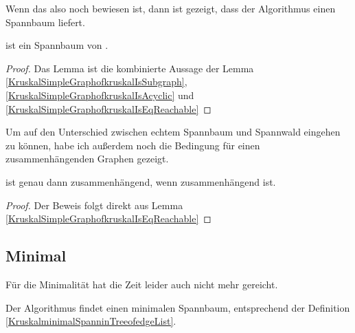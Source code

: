 Wenn das also noch bewiesen ist, dann ist gezeigt, dass der Algorithmus einen Spannbaum liefert.

\begin{lemma}[\KruskalSimpleGraphofkruskalIsSpanningTree]\label{KruskalSimpleGraphofkruskalIsSpanningTree}
  \KruskalSimpleGraphofkruskal ist ein Spannbaum von \KruskalSimpleGraphofnofedgeList.
\end{lemma}
\begin{proof}
  Das Lemma ist die kombinierte Aussage der Lemma \ref{KruskalSimpleGraphofkruskalIsSubgraph},  \ref{KruskalSimpleGraphofkruskalIsAcyclic} und  \ref{KruskalSimpleGraphofkruskalIsEqReachable}
\end{proof}

Um auf den Unterschied zwischen echtem Spannbaum und Spannwald eingehen zu können, habe ich außerdem noch die Bedingung für einen zusammenhängenden Graphen gezeigt.

\begin{lemma}[\KruskalSimpleGraphofkruskalconnectediffconnected]
  \KruskalSimpleGraphofkruskal ist genau dann zusammenhängend, wenn \KruskalSimpleGraphofnofedgeList zusammenhängend ist.
\end{lemma}
\begin{proof}
  Der Beweis folgt direkt aus Lemma \ref{KruskalSimpleGraphofkruskalIsEqReachable}
\end{proof}

\subsection{Minimal}

Für die Minimalität hat die Zeit leider auch nicht mehr gereicht.

\begin{theorem}
  Der Algorithmus findet einen minimalen Spannbaum, entsprechend der Definition \ref{KruskalminimalSpanninTreeofedgeList}.
\end{theorem}
\begin{lemma}[\KruskalkruskalminimalSpanninTreeofedgeList]
\end{lemma}

